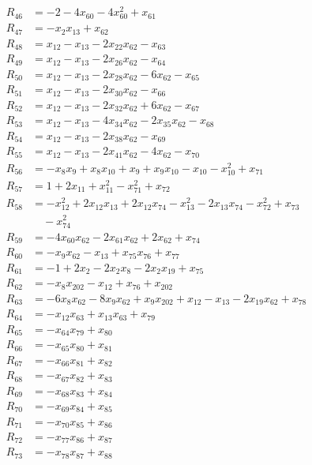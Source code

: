 \begin{align*}
R_{46}&=-2-4x_{60}-4x_{60}^{2}+x_{61}\\[2pt]
R_{47}&=-x_{2}x_{13}+x_{62}\\[2pt]
R_{48}&=x_{12}-x_{13}-2x_{22}x_{62}-x_{63}\\[2pt]
R_{49}&=x_{12}-x_{13}-2x_{26}x_{62}-x_{64}\\[2pt]
R_{50}&=x_{12}-x_{13}-2x_{28}x_{62}-6x_{62}-x_{65}\\[2pt]
R_{51}&=x_{12}-x_{13}-2x_{30}x_{62}-x_{66}\\[2pt]
R_{52}&=x_{12}-x_{13}-2x_{32}x_{62}+6x_{62}-x_{67}\\[2pt]
R_{53}&=x_{12}-x_{13}-4x_{34}x_{62}-2x_{35}x_{62}-x_{68}\\[2pt]
R_{54}&=x_{12}-x_{13}-2x_{38}x_{62}-x_{69}\\[2pt]
R_{55}&=x_{12}-x_{13}-2x_{41}x_{62}-4x_{62}-x_{70}\\[2pt]
R_{56}&=-x_{8}x_{9}+x_{8}x_{10}+x_{9}+x_{9}x_{10}-x_{10}-x_{10}^{2}+x_{71}\\[2pt]
R_{57}&=1+2x_{11}+x_{11}^{2}-x_{71}^{2}+x_{72}\\[2pt]
R_{58}&=-x_{12}^{2}+2x_{12}x_{13}+2x_{12}x_{74}-x_{13}^{2}-2x_{13}x_{74}-x_{72}^{2}+x_{73}\\
&\quad -x_{74}^{2}\\[2pt]
R_{59}&=-4x_{60}x_{62}-2x_{61}x_{62}+2x_{62}+x_{74}\\[2pt]
R_{60}&=-x_{9}x_{62}-x_{13}+x_{75}x_{76}+x_{77}\\[2pt]
R_{61}&=-1+2x_{2}-2x_{2}x_{8}-2x_{2}x_{19}+x_{75}\\[2pt]
R_{62}&=-x_{8}x_{202}-x_{12}+x_{76}+x_{202}\\[2pt]
R_{63}&=-6x_{8}x_{62}-8x_{9}x_{62}+x_{9}x_{202}+x_{12}-x_{13}-2x_{19}x_{62}+x_{78}\\[2pt]
R_{64}&=-x_{12}x_{63}+x_{13}x_{63}+x_{79}\\[2pt]
R_{65}&=-x_{64}x_{79}+x_{80}\\[2pt]
R_{66}&=-x_{65}x_{80}+x_{81}\\[2pt]
R_{67}&=-x_{66}x_{81}+x_{82}\\[2pt]
R_{68}&=-x_{67}x_{82}+x_{83}\\[2pt]
R_{69}&=-x_{68}x_{83}+x_{84}\\[2pt]
R_{70}&=-x_{69}x_{84}+x_{85}\\[2pt]
R_{71}&=-x_{70}x_{85}+x_{86}\\[2pt]
R_{72}&=-x_{77}x_{86}+x_{87}\\[2pt]
R_{73}&=-x_{78}x_{87}+x_{88}\\[2pt]

\end{align*}
